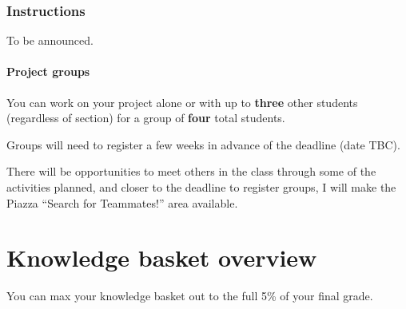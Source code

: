 \documentclass[
  openany]{book}
\begin{document}
\hypertarget{instructions-4}{%
\subsection{Instructions}\label{instructions-4}}

To be announced.

\hypertarget{project-groups}{%
\subsubsection{Project groups}\label{project-groups}}

You can work on your project alone or with up to \textbf{three} other students (regardless of section) for a group of \textbf{four} total students.

Groups will need to register a few weeks in advance of the deadline (date TBC).

There will be opportunities to meet others in the class through some of the activities planned, and closer to the deadline to register groups, I will make the Piazza ``Search for Teammates!'' area available.

\hypertarget{knowledge-basket-overview}{%
\chapter{Knowledge basket overview}\label{knowledge-basket-overview}}

You can max your knowledge basket out to the full 5\% of your final grade.
\end{document}
